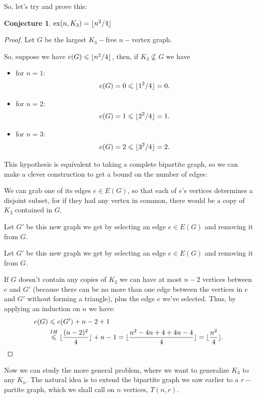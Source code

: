 \documentclass[english, dark, index]{Iart}
\newtheorem{conjecture}{Conjecture}[chapter]
\DeclareMathOperator{\ex}{ex}
\DeclarePairedDelimiter\floor{\lfloor}{\rfloor}
\begin{document}
	
	So, let's try and prove this:
	
	\begin{conjecture}
		$ \ex(n,K_3)=\floor{n^{2}/4} $
	\end{conjecture}

	\begin{proof}
		Let $ G $ be the largest $ K_3- $free $ n-$vertex graph.
		
		So, suppose we have $ e(G)\leqslant \floor{n^{2}/4} $, then, if $ K_3\nsubseteq G $ we have
		\begin{itemize}
			\item for $ n=1 $:
			\[ e(G)=0\leqslant \floor{1^{2}/4}=0. \]
			\item for $ n=2 $:
			\[ e(G)=1\leqslant \floor{2^{2}/4}=1. \]
			\item for $ n=3 $:
			\[ e(G)=2\leqslant \floor{3^{2}/4}=2. \]
		\end{itemize}
		
		This hypothesis is equivalent to taking a complete bipartite graph, so we can make a clever construction to get a bound on the number of edges:
		
		We can grab one of its edges $ e\in E(G) $, so that each of $ e $'s vertices determines a disjoint subset, for if they had any vertex in common, there would be a copy of $ K_3 $ contained in $ G $.
		
		Let $ G' $ be this new graph we get by selecting an edge $ e\in E(G) $ and removing it from $ G $.
		
		Let $ G' $ be this new graph we get by selecting an edge $ e\in E(G) $ and removing it from $ G $.
		
		If $ G $ doesn't contain any copies of $ K_3 $ we can have at most $ n-2 $ vertices between $ e $ and $ G' $ (because there can be no more than one edge between the vertices in $ e $ and $ G' $ without forming a triangle), plus the edge $ e $ we've selected. Thus, by applying an induction on $ n $ we have:
		\begin{align*}
			e(G)&\leqslant e(G')+n-2+1\\
					&\overset{IH}{\leqslant}\floor{\dfrac{(n-2)^{2}}{4}}+n-1=\floor{\dfrac{n^{2}-4n+4+4n-4}{4}}=\floor{\dfrac{n^{2}}{4}}.
		\end{align*}
	\end{proof}

	Now we can study the more general problem, where we want to generalize $ K_3 $ to any $ K_n $. The natural idea is to extend the bipartite graph we saw earlier to a $ r- $partite graph, which we shall call  on $ n $ vertices, $ T(n,r) $.
\end{document}
